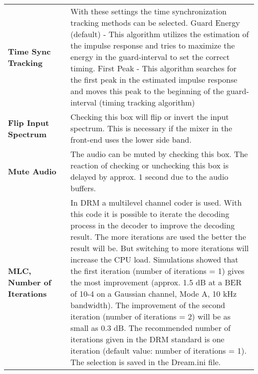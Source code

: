 \begin{table}[htb]
\begin{center}
\begin{tabular}{p{0.25\linewidth} | p{0.75\linewidth}}
			\textbf{Time Sync Tracking} & 	With these settings the time synchronization tracking methods can be selected.
			Guard Energy (default) - This algorithm utilizes the estimation of the impulse response and tries to maximize the energy in the guard-interval to set the correct timing.
			First Peak - This algorithm searches for the first peak in the estimated impulse response and moves this peak to the beginning of the guard-interval (timing tracking algorithm) \\
			
			\textbf{Flip Input Spectrum} & Checking this box will flip or invert the input spectrum. This is necessary if the mixer in the front-end uses the lower side band.
			\\
			
			\textbf{Mute Audio} & The audio can be muted by checking this box. The reaction of checking or unchecking this box is delayed by approx. 1 second due to the audio buffers.
			\\
			
			\textbf{MLC, Number of Iterations} & In DRM a multilevel channel coder is used. With this code it is possible to iterate the decoding process in the decoder to improve the decoding result. The more iterations are used the better the result will be. But switching to more iterations will increase the CPU load. Simulations showed that the first iteration (number of iterations = 1) gives the most improvement (approx. 1.5 dB at a BER of 10-4 on a Gaussian channel, Mode A, 10 kHz bandwidth). The improvement of the second iteration (number of iterations = 2) will be as small as 0.3 dB.
			The recommended number of iterations given in the DRM standard is one iteration (default value: number of iterations = 1).
			The selection is saved in the Dream.ini file. \\
			

\end{tabular}
\end{center}
\end{table}
